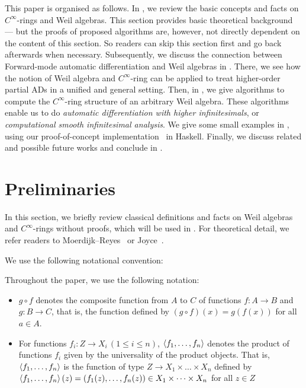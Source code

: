 This paper is organised as follows.
In , we review the basic concepts and facts on $C^\infty$-rings and Weil algebras.
This section provides basic theoretical background --- but the proofs of proposed algorithms are, however, not directly dependent on the content of this section.
So readers can skip this section first and go back afterwards when necessary.
Subsequently, we discuss the connection between Forward-mode automatic differentiation and Weil algebras in .
There, we see how the notion of Weil algebra and $C^\infty$-ring can be applied to treat higher-order partial ADs in a unified and general setting.
Then, in , we give algorithms to compute the $C^\infty$-ring structure of an arbitrary Weil algebra. These algorithms enable us to do \emph{automatic differentiation with higher infinitesimals}, or \emph{computational smooth infinitesimal analysis}.
We give some small examples in , using our proof-of-concept implementation~\cite{Ishii:2020aa} in Haskell.
Finally, we discuss related and possible future works and conclude in .

\section{Preliminaries}\label{sec:prel}
In this section, we briefly review classical definitions and facts on Weil algebras and $C^\infty$-rings without proofs, which will be used in .
For theoretical detail, we refer readers to Moerdijk--Reyes~\cite[Chapters I and II]{Moerdijk:1991aa} or Joyce~\cite{joyce2016algebraic}.

We use the following notational convention:
\begin{definition}[Notation]
  Throughout the paper, we use the following notation:
  \begin{itemize}
    \item
    $g \circ f$ denotes the composite function from $A$ to $C$ of functions $f: A \to B$ and $g: B \to C$, that is, the function defined by $(g \circ f)(x) = g(f(x))$ for all $a \in A$.
    \item For functions $f_i: Z \to X_i\,(1 \leq i \leq n)$,
    $\braket{f_1, \dots, f_n}$ denotes the product of functions $f_i$ given by the universality of the product objects.
    That is, $\braket{f_1, \dots, f_n}$ is the function of type $Z \to X_1 \times \dots \times X_n$ defined by $\braket{f_1, \dots, f_n}(z) = (f_1(z), \dots, f_n(z)) \in X_1 \times \dots \times X_n$ for all $z \in Z$
  \end{itemize}
\end{definition}

